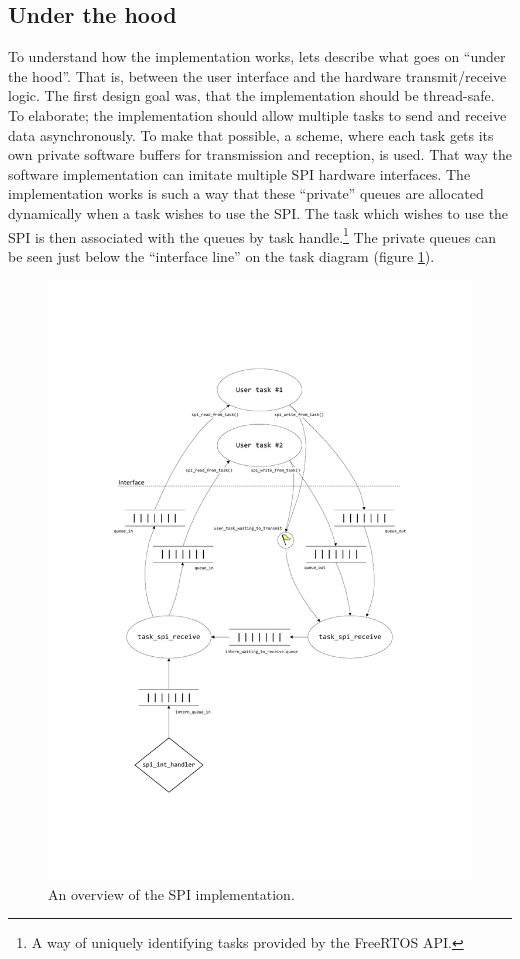 \subsection{Under the hood}\label{sec:spi_underthehood}
To understand how the implementation works, lets describe what goes on ``under the hood''. That is, between the user interface and the hardware transmit/receive logic. The first design goal was, that the implementation should be thread-safe. To elaborate; the implementation should allow multiple tasks to send and receive data asynchronously. To make that possible, a scheme, where each task gets its own private software buffers for transmission and reception, is used. That way the software implementation can imitate multiple SPI hardware interfaces. The implementation works is such a way that these ``private'' queues are allocated dynamically when a task wishes to use the SPI. The task which wishes to use the SPI is then associated with the queues by task handle.\footnote{A way of uniquely identifying tasks provided by the FreeRTOS API.} The private queues can be seen just below the ``interface line'' on the task diagram (figure \ref{fig:spi_task_diagram}).

\begin{figure}[htb]
  \centering
  \includegraphics[width=\textwidth,clip,trim=90 110 90 110]{content/04_communication/figures/spi_task_diagram_running.pdf}
  \caption{An overview of the SPI implementation.}
  \label{fig:spi_task_diagram}
\end{figure}%

